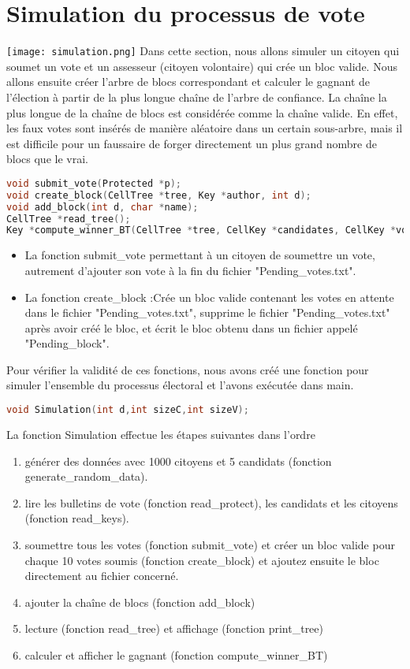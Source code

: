\documentclass{article}
\begin{document}
\section{ Simulation du processus de vote}
\texttt{[image: simulation.png]}
Dans cette section, nous allons simuler un citoyen qui soumet un vote et un assesseur (citoyen volontaire) qui crée un bloc valide. Nous allons ensuite créer l'arbre de blocs correspondant et calculer le gagnant de l'élection à partir de la plus longue chaîne de l'arbre de confiance.\newline\newline
La chaîne la plus longue de la chaîne de blocs est considérée comme la chaîne valide. En effet, les faux votes sont insérés de manière aléatoire dans un certain sous-arbre, mais il est difficile pour un faussaire de forger directement un plus grand nombre de blocs que le vrai.
\begin{lstlisting}[language={C}]
void submit_vote(Protected *p);
void create_block(CellTree *tree, Key *author, int d);
void add_block(int d, char *name);
CellTree *read_tree();
Key *compute_winner_BT(CellTree *tree, CellKey *candidates, CellKey *voters, int sizeC, int sizeV);
\end{lstlisting}
\begin{itemize}
\item La fonction submit\_vote permettant à un citoyen de soumettre un vote, autrement d’ajouter son vote à la fin du fichier "Pending\_votes.txt".
\item La fonction create\_block :Crée un bloc valide contenant les votes en attente dans le fichier "Pending\_votes.txt", supprime le fichier "Pending\_votes.txt" après avoir créé le bloc, et écrit le bloc obtenu dans un fichier appelé "Pending\_block".

\end{itemize}
Pour vérifier la validité de ces fonctions, nous avons créé une fonction pour simuler l'ensemble du processus électoral et l'avons exécutée dans main.
\begin{lstlisting}[language={C}]
void Simulation(int d,int sizeC,int sizeV);
\end{lstlisting}
La fonction Simulation effectue les étapes suivantes dans l'ordre
\begin{enumerate}
\item générer des données avec 1000 citoyens et 5 candidats (fonction generate\_random\_data).
\item lire les bulletins de vote (fonction read\_protect), les candidats et les citoyens (fonction read\_keys).
\item soumettre tous les votes (fonction submit\_vote) et créer un bloc valide pour chaque 10 votes soumis (fonction create\_block) et ajoutez ensuite le bloc directement au fichier concerné.
\item ajouter la chaîne de blocs (fonction add\_block)
\item lecture (fonction read\_tree) et affichage (fonction print\_tree)
\item calculer et afficher le gagnant (fonction compute\_winner\_BT)
\end{enumerate}
\end{document}

